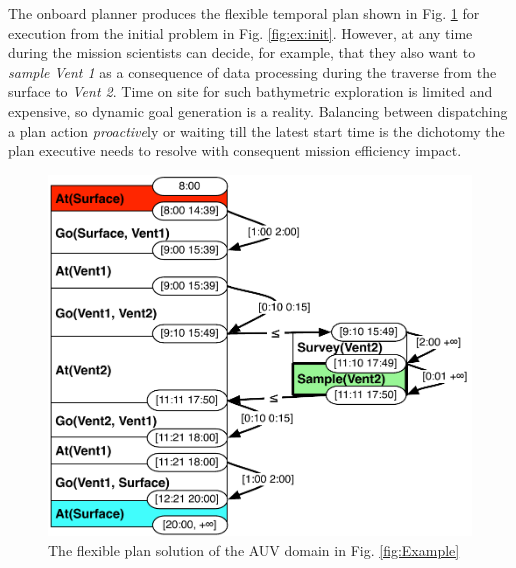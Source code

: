 The onboard planner produces the flexible temporal plan shown in
Fig. \ref{fig:ex:plan} for execution from the initial problem in
Fig. \ref{fig:ex:init}. However, at any time during the mission
scientists can decide, for example, that they also want to {\em
  sample} {\em Vent 1} as a consequence of data processing during the
traverse from the surface to {\em Vent 2}.  Time on site for such
bathymetric exploration is limited and expensive, so dynamic goal
generation is a reality.  Balancing between dispatching a plan action
\emph{proactive}ly or waiting till the latest start time is the
dichotomy the plan executive needs to resolve with consequent mission
efficiency impact.


\begin{figure}[!htb]
  \centering
  \includegraphics[width=0.8\columnwidth]{figs/example_plan}
  \caption{\small The flexible plan solution of the AUV domain in
    Fig. \ref{fig:Example}}
  \label{fig:ex:plan}
\end{figure}

